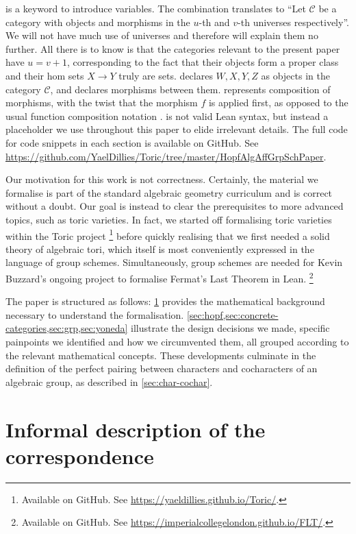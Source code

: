 \documentclass{article}
\newcommand{\mcC}{\mathcal C}
\begin{document}
 is a keyword to introduce variables.
The combination  translates to ``Let $\mcC$ be a category with objects and morphisms in the $u$-th and $v$-th universes respectively''.
We will not have much use of universes and therefore will explain them no further.
All there is to know is that the categories relevant to the present paper have $u = v + 1$, corresponding to the fact that their objects form a proper class and their hom sets $X \to Y$ truly are sets.
 declares $W, X, Y, Z$ as objects in the category $\mcC$, and  declares morphisms between them.
 represents composition of morphisms, with the twist that the morphism $f$ is applied first, as opposed to the usual function composition notation .
 is not valid Lean syntax, but instead a placeholder we use throughout this paper to elide irrelevant details.
The full code for code snippets in each section is available on GitHub. See \url{https://github.com/YaelDillies/Toric/tree/master/HopfAlgAffGrpSchPaper}.

Our motivation for this work is not correctness.
Certainly, the material we formalise is part of the standard algebraic geometry curriculum and is correct without a doubt.
Our goal is instead to clear the prerequisites to more advanced topics, such as toric varieties.
In fact, we started off formalising toric varieties within the Toric project
\footnote{Available on GitHub. See \url{https://yaeldillies.github.io/Toric/}.}
before quickly realising that we first needed a solid theory of algebraic tori, which itself is most conveniently expressed in the language of group schemes.
Simultaneously, group schemes are needed for Kevin Buzzard's ongoing project to formalise Fermat's Last Theorem in Lean.
\footnote{Available on GitHub. See \url{https://imperialcollegelondon.github.io/FLT/}.}

The paper is structured as follows:
\cref{sec:informal} provides the mathematical background necessary to understand the formalisation.
\cref{sec:hopf,sec:concrete-categories,sec:grp,sec:yoneda} illustrate the design decisions we made, specific painpoints we identified and how we circumvented them, all grouped according to the relevant mathematical concepts.
These developments culminate in the definition of the perfect pairing between characters and cocharacters of an algebraic group, as described in \cref{sec:char-cochar}.


\section{Informal description of the correspondence}\label{sec:informal}
\end{document}
